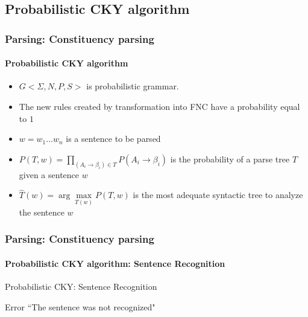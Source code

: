\documentclass[xcolor=table]{beamer}
\begin{document}
\subsection{Probabilistic CKY algorithm}

\begin{frame}
\frametitle{Parsing: Constituency parsing}
\framesubtitle{Probabilistic CKY algorithm}

\begin{itemize}
	\item $G<\Sigma, N, P, S>$ is probabilistic grammar.
	\item The new rules created by transformation into FNC have a probability equal to $1$
	\item $w = w_1 \ldots w_n$ is a sentence to be parsed
	\item $P(T, w) = \prod\limits_{(A_i \rightarrow \beta_i) \in T} P(A_i \rightarrow \beta_i)$ is the probability of a parse tree $T$ given a sentence $w$
	\item $\hat{T}(w) = \arg\max\limits_{T(w)} P(T, w) $ is the most adequate syntactic tree to analyze the sentence $w$
\end{itemize}

\end{frame}

\begin{frame}
\frametitle{Parsing: Constituency parsing}
\framesubtitle{Probabilistic CKY algorithm: Sentence Recognition}

\begin{block}{Probabilistic CKY: Sentence Recognition}
	\scriptsize\vspace{-3pt}
	\begin{algorithm}[H]
		
		
		
		 {
			Error ``The sentence was not recognized"
		}
		\vspace{-3pt}
	\end{algorithm}
\end{block}

\end{frame}
\end{document}
